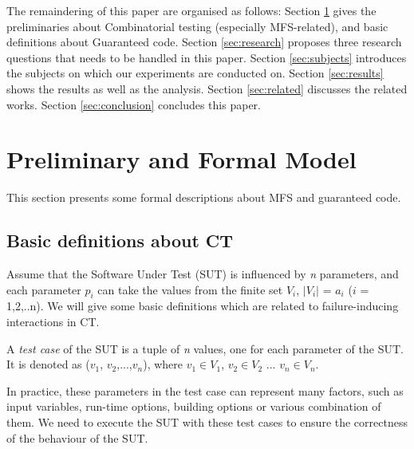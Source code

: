 \documentclass{sig-alternate-05-2015}
\begin{document}


The remaindering of this paper are organised as follows: Section \ref{sec:pre} gives the preliminaries about Combinatorial testing (especially MFS-related), and basic definitions about Guaranteed code. Section \ref{sec:research} proposes three research questions that needs to be handled in this paper. Section \ref{sec:subjects} introduces the subjects on which our experiments are conducted on. Section \ref{sec:results} shows the results as well as the analysis. Section \ref{sec:related} discusses the related works.  Section \ref{sec:conclusion} concludes this paper.

\section{Preliminary and Formal Model}\label{sec:pre}
This section presents some formal descriptions about MFS and guaranteed code.

\subsection{Basic definitions about CT}\label{sec:pre:ct}

Assume that the Software Under Test (SUT) is influenced by \emph{n} parameters, and each parameter $p_{i}$ can take the values from the finite set $V_{i}$, $|V_{i}|$ = $a_{i}$ ($i$ = 1,2,..n). We will give some basic definitions which are related to failure-inducing interactions in CT.

\begin{definition}
A \emph{test case} of the SUT is a tuple of \emph{n} values, one for each parameter of the SUT. It is denoted as  ($v_{1}$, $v_{2}$,...,$v_{n}$), where $v_{1}\in V_{1}$, $v_{2} \in V_{2}$ ... $v_{n} \in V_{n}$.
\end{definition}

In practice, these parameters in the test case can represent many factors, such as input variables, run-time options, building options or various combination of them. We need to execute the SUT with these test cases to ensure the correctness of the behaviour of the SUT.
\end{document}
